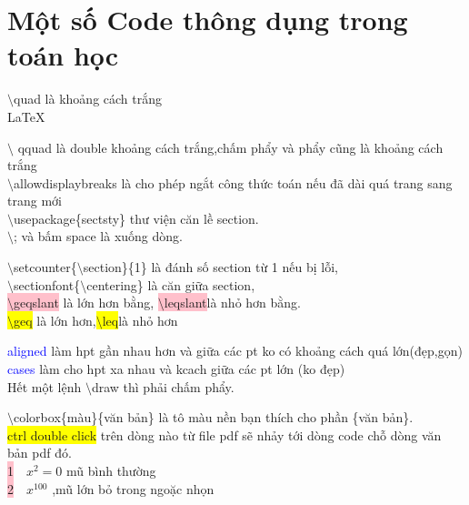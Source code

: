 \documentclass{article}
\begin{document}
\Large\section*{Một số Code thông dụng trong toán học}
\large $\setminus$quad là khoảng cách trắng\\

\LaTeX\

$\setminus$ qquad là double khoảng cách trắng,chấm phẩy và phẩy cũng là khoảng cách trắng\\

$\setminus$allowdisplaybreaks là cho phép ngắt công thức toán nếu đã dài quá trang sang trang mới\\

$\setminus$usepackage\{sectsty\} thư viện căn lề section.\\

$\setminus$; và bấm space là xuống dòng.\;


$\setminus$setcounter\{$\setminus$section\}\{1\} là đánh số section từ 1 nếu bị lỗi,\\

$\setminus$sectionfont\{$\setminus$centering\} là căn giữa section,\\


\colorbox{pink}{$\setminus$geqslant} là lớn hơn bằng, \colorbox{pink}{$\setminus$leqslant}là nhỏ hơn bằng.\\

\colorbox{yellow}{$\setminus$geq} là lớn hơn,\colorbox{yellow}{$\setminus$leq}là nhỏ hơn

\textcolor{blue}{aligned} làm hpt gần nhau hơn và giữa các pt ko có khoảng cách quá lớn(đẹp,gọn)\\

\textcolor{blue}{cases} làm cho hpt xa nhau và kcach giữa các pt lớn (ko đẹp)\\

Hết một lệnh $\setminus$draw thì phải chấm phẩy.

$\setminus$colorbox\{màu\}\{văn bản\} là tô màu nền bạn thích cho phần \{văn bản\}.\\

\colorbox{yellow}{ctrl double click} trên dòng nào từ file pdf sẽ nhảy tới dòng code chỗ dòng văn bản pdf đó.\\

\colorbox{pink}{1}$\quad x^2=0$  \quad     mũ bình thường \\

\colorbox{pink}{2}$\quad x^{100}$ \quad ,mũ lớn bỏ trong ngoặc nhọn\\
\end{document}
